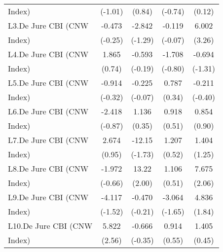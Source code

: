 {\begin{tabular}{l*{4}{c}}
Index)              &     (-1.01)         &      (0.84)         &     (-0.74)         &      (0.12)         \\
[1em]
L3.De Jure CBI (CNW &      -0.473         &      -2.842         &      -0.119         &       6.002\sym{**} \\
Index)              &     (-0.25)         &     (-1.29)         &     (-0.07)         &      (3.26)         \\
[1em]
L4.De Jure CBI (CNW &       1.865         &      -0.593         &      -1.708         &      -0.694         \\
Index)              &      (0.74)         &     (-0.19)         &     (-0.80)         &     (-1.31)         \\
[1em]
L5.De Jure CBI (CNW &      -0.914         &      -0.225         &       0.787         &      -0.211         \\
Index)              &     (-0.32)         &     (-0.07)         &      (0.34)         &     (-0.40)         \\
[1em]
L6.De Jure CBI (CNW &      -2.418         &       1.136         &       0.918         &       0.854         \\
Index)              &     (-0.87)         &      (0.35)         &      (0.51)         &      (0.90)         \\
[1em]
L7.De Jure CBI (CNW &       2.674         &      -12.15         &       1.207         &       1.404         \\
Index)              &      (0.95)         &     (-1.73)         &      (0.52)         &      (1.25)         \\
[1em]
L8.De Jure CBI (CNW &      -1.972         &       13.22\sym{*}  &       1.106         &       7.675\sym{*}  \\
Index)              &     (-0.66)         &      (2.00)         &      (0.51)         &      (2.06)         \\
[1em]
L9.De Jure CBI (CNW &      -4.117         &      -0.470         &      -3.064         &       4.836         \\
Index)              &     (-1.52)         &     (-0.21)         &     (-1.65)         &      (1.84)         \\
[1em]
L10.De Jure CBI (CNW&       5.822\sym{*}  &      -0.666         &       0.914         &       1.405         \\
Index)              &      (2.56)         &     (-0.35)         &      (0.55)         &      (0.45)         \\

\end{tabular}}
